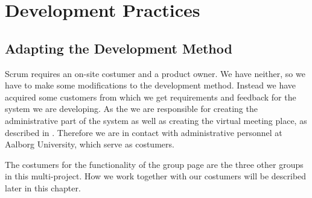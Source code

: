 \chapter{Development Practices} %
\label{sec:developmentpractice}



\section{Adapting the Development Method}



Scrum requires an on-site costumer and a product owner.
We have neither, so we have to make some modifications to the development method.
Instead we have acquired some customers from which we get requirements and feedback for the system we are developing.
As the \groupname{} we are responsible for creating the administrative part of the system as well as creating the virtual meeting place, as described in .
Therefore we are in contact with administrative personnel at Aalborg University, which serve as costumers.

The costumers for the functionality of the group page are the three other groups in this multi-project.
How we work together with our costumers will be described later in this chapter.

